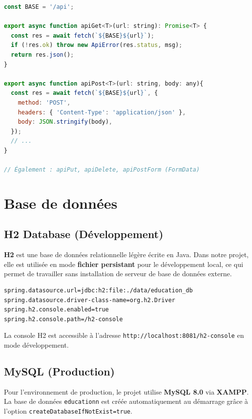 \begin{lstlisting}[language=JavaScript,caption={Service API centralisé (extrait de api.ts)}]
const BASE = '/api';

export async function apiGet<T>(url: string): Promise<T> {
  const res = await fetch(`${BASE}${url}`);
  if (!res.ok) throw new ApiError(res.status, msg);
  return res.json();
}

export async function apiPost<T>(url: string, body: any){
  const res = await fetch(`${BASE}${url}`, {
    method: 'POST',
    headers: { 'Content-Type': 'application/json' },
    body: JSON.stringify(body),
  });
  // ...
}

// Également : apiPut, apiDelete, apiPostForm (FormData)
\end{lstlisting}

\section{Base de données}

\subsection{H2 Database (Développement)}

\textbf{H2} est une base de données relationnelle légère écrite en Java. Dans notre projet, elle est utilisée en mode \textbf{fichier persistant} pour le développement local, ce qui permet de travailler sans installation de serveur de base de données externe.

\begin{lstlisting}[caption={Configuration H2 (application-h2.properties)}]
spring.datasource.url=jdbc:h2:file:./data/education_db
spring.datasource.driver-class-name=org.h2.Driver
spring.h2.console.enabled=true
spring.h2.console.path=/h2-console
\end{lstlisting}

La console H2 est accessible à l'adresse \texttt{http://localhost:8081/h2-console} en mode développement.

\subsection{MySQL (Production)}

Pour l'environnement de production, le projet utilise \textbf{MySQL 8.0} via \textbf{XAMPP}. La base de données \texttt{educationn} est créée automatiquement au démarrage grâce à l'option \texttt{createDatabaseIfNotExist=true}.

